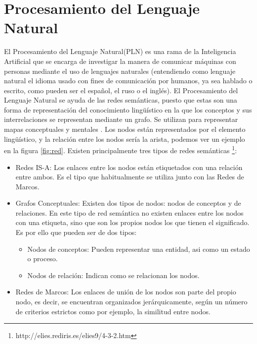 \section{Procesamiento del Lenguaje Natural}
\label{cap:sec:lenguajenatural}
El Procesamiento del Lenguaje Natural(PLN) es una rama de la Inteligencia Artificial que se encarga de investigar la manera de comunicar máquinas con personas mediante el uso de lenguajes naturales (entendiendo como lenguaje natural el idioma usado con fines de comunicación por humanos, ya sea hablado o escrito, como pueden ser el español, el ruso o el inglés). 
El Procesamiento del Lenguaje Natural se ayuda de las redes semánticas, puesto que estas son una forma de representación del conocimiento lingüístico en la que los conceptos y sus interrelaciones se representan mediante un grafo. Se utilizan para representar mapas conceptuales y mentales \citep{wiki:redSemantica2018}.
Los nodos están representados por el elemento lingüístico, y  la relación entre los nodos sería la arista, podemos ver un ejemplo en la figura \ref{fig:red}.
Existen principalmente tres tipos de redes semánticas \footnote{http://elies.rediris.es/elies9/4-3-2.htm}:
\begin{itemize}
	\item Redes IS-A: Los enlaces entre los nodos están etiquetados con una relación entre ambos. Es el tipo que habitualmente se utiliza junto con las Redes de Marcos.
	\item Grafos Conceptuales: Existen dos tipos de nodos: nodos de conceptos y de relaciones. En este tipo de red semántica no existen enlaces entre los nodos con una etiqueta, sino que son los propios nodos los que tienen el significado. Es por ello que pueden ser de dos tipos:
		\begin{itemize}
			\item Nodos de conceptos: Pueden representar una entidad, asi como un estado o proceso.
			\item Nodos de relación: Indican como se relacionan los nodos.			
		\end{itemize}
	\item Redes de Marcos: Los enlaces de unión de los nodos son parte del propio nodo, es decir, se encuentran organizados jerárquicamente, según un número de criterios estrictos como por ejemplo, la similitud entre nodos.
\end{itemize}

